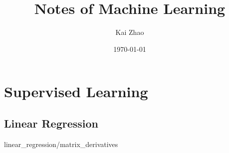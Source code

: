 \documentclass [11pt]{book}
\title {Notes of Machine Learning}
\author {Kai Zhao}
\date {\today}
\begin{document}
\maketitle

\tableofcontents


\part {Supervised Learning}

\chapter {Linear Regression}

 {linear_regression/matrix_derivatives}
\end{document}
